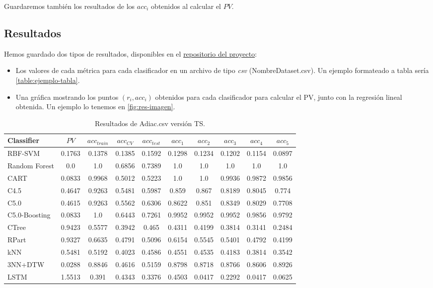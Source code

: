 Guardaremos también los resultados de los $acc_i$ obtenidos al calcular el $PV$.

\subsection{Resultados}

Hemos guardado dos tipos de resultados, disponibles en el \href{https://github.com/MiguelLentisco/tfg}{repositorio del proyecto}:

\begin{itemize}
  \item Los valores de cada métrica para cada clasificador en un archivo de tipo \emph{csv} (NombreDataset.csv). Un ejemplo formateado a tabla sería \autoref{table:ejemplo-tabla}.
  \item Una gráfica mostrando los puntos ${(r_i, acc_i)}$ obtenidos para cada clasificador para calcular el PV, junto con la regresión lineal obtenida. Un ejemplo lo tenemos en \autoref{fig:res-imagen}.
\end{itemize}

\begin{table}[htbp]
\centering
\begin{tabular}{||l | c c c c c c c c c||}
 \hline
 Classifier & $PV$ & $acc_{train}$ & $acc_{CV}$ & $acc_{test}$ & $acc_1$ & $acc_2$ & $acc_3$ & $acc_4$ & $acc_5$ \\ [0.5ex]
 \hline\hline
 RBF-SVM & 0.1763 & 0.1378 & 0.1385 & 0.1592 & 0.1298 & 0.1234 & 0.1202 & 0.1154 & 0.0897 \\
 Random Forest &0.0 & 1.0 & 0.6856 & 0.7389 & 1.0 & 1.0 & 1.0 & 1.0 & 1.0 \\
 CART & 0.0833 & 0.9968 & 0.5012 & 0.5223 & 1.0 & 1.0 & 0.9936 & 0.9872 & 0.9856 \\
 C4.5 & 0.4647 & 0.9263 & 0.5481 & 0.5987 & 0.859 & 0.867 & 0.8189 & 0.8045 & 0.774 \\
 C5.0 & 0.4615 & 0.9263 & 0.5562 & 0.6306 & 0.8622 & 0.851 & 0.8349 & 0.8029 & 0.7708 \\
 C5.0-Boosting & 0.0833 & 1.0 & 0.6443 & 0.7261 & 0.9952 & 0.9952 & 0.9952 & 0.9856 & 0.9792 \\
 CTree & 0.9423 & 0.5577 & 0.3942 & 0.465 & 0.4311 & 0.4199 & 0.3814 & 0.3141 & 0.2484 \\
 RPart & 0.9327 & 0.6635 & 0.4791 & 0.5096 & 0.6154 & 0.5545 & 0.5401 & 0.4792 & 0.4199 \\
 kNN & 0.5481 & 0.5192 & 0.4023 & 0.4586 & 0.4551 & 0.4535 & 0.4183 & 0.3814 & 0.3542 \\
 3NN+DTW & 0.0288 & 0.8846 & 0.4616 & 0.5159 & 0.8798 & 0.8718 & 0.8766 & 0.8606 & 0.8926 \\
 LSTM & 1.5513 & 0.391 & 0.4343 & 0.3376 & 0.4503 & 0.0417 & 0.2292 & 0.0417 & 0.0625 \\ [1ex]
 \hline
\end{tabular}
\caption{Resultados de Adiac.csv versión TS.}
\label{table:ejemplo-tabla}
\end{table}

